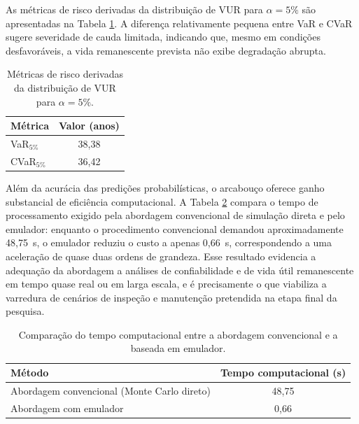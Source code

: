 As métricas de risco derivadas da distribuição de VUR para $\alpha = 5\%$ são apresentadas na Tabela \ref{tab:var_cvar_rul}. A diferença relativamente pequena entre VaR e CVaR sugere severidade de cauda limitada, indicando que, mesmo em condições desfavoráveis, a vida remanescente prevista não exibe degradação abrupta.

\begin{table}[H]
\centering
\caption{Métricas de risco derivadas da distribuição de VUR para $\alpha = 5\%$.}
\label{tab:var_cvar_rul}
\begin{tabular}{lc}
\toprule
\textbf{Métrica} & \textbf{Valor (anos)} \\
\midrule
VaR$_{5\%}$  & 38,38 \\
CVaR$_{5\%}$ & 36,42 \\
\bottomrule
\end{tabular}
\vspace{0.2cm}
\end{table}

Além da acurácia das predições probabilísticas, o arcabouço oferece ganho substancial de eficiência computacional. A Tabela \ref{tab:computational_time} compara o tempo de processamento exigido pela abordagem convencional de simulação direta e pelo emulador: enquanto o procedimento convencional demandou aproximadamente 48,75~s, o emulador reduziu o custo a apenas 0,66~s, correspondendo a uma aceleração de quase duas ordens de grandeza. Esse resultado evidencia a adequação da abordagem a análises de confiabilidade e de vida útil remanescente em tempo quase real ou em larga escala, e é precisamente o que viabiliza a varredura de cenários de inspeção e manutenção pretendida na etapa final da pesquisa.

\begin{table}[H]
\centering
\caption{Comparação do tempo computacional entre a abordagem convencional e a baseada em emulador.}
\label{tab:computational_time}
\begin{tabular}{lc}
\toprule
\textbf{Método} & \textbf{Tempo computacional (s)} \\
\midrule
Abordagem convencional (Monte Carlo direto) & 48,75 \\
Abordagem com emulador                      & 0,66 \\
\bottomrule
\end{tabular}
\vspace{0.2cm}
\end{table}

